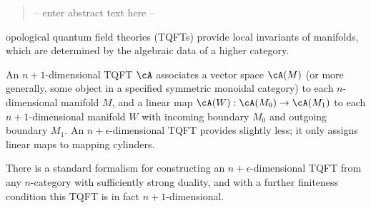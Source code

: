 \documentclass{pnastwo}
\begin{document}
\begin{article}

\begin{abstract} -- enter abstract text here -- \end{abstract}







opological quantum field theories (TQFTs) provide local invariants of manifolds, which are determined by the algebraic data of a higher category.

An $n+1$-dimensional TQFT $\cA$ associates a vector space $\cA(M)$
(or more generally, some object in a specified symmetric monoidal category)
to each $n$-dimensional manifold $M$, and a linear map
$\cA(W): \cA(M_0) \to \cA(M_1)$ to each $n+1$-dimensional manifold $W$
with incoming boundary $M_0$ and outgoing boundary $M_1$.
An $n+\epsilon$-dimensional TQFT provides slightly less;
it only assigns linear maps to mapping cylinders.

There is a standard formalism for constructing an $n+\epsilon$-dimensional
TQFT from any $n$-category with sufficiently strong duality,
and with a further finiteness condition this TQFT is in fact $n+1$-dimensional.


\end{article}
\end{document}
